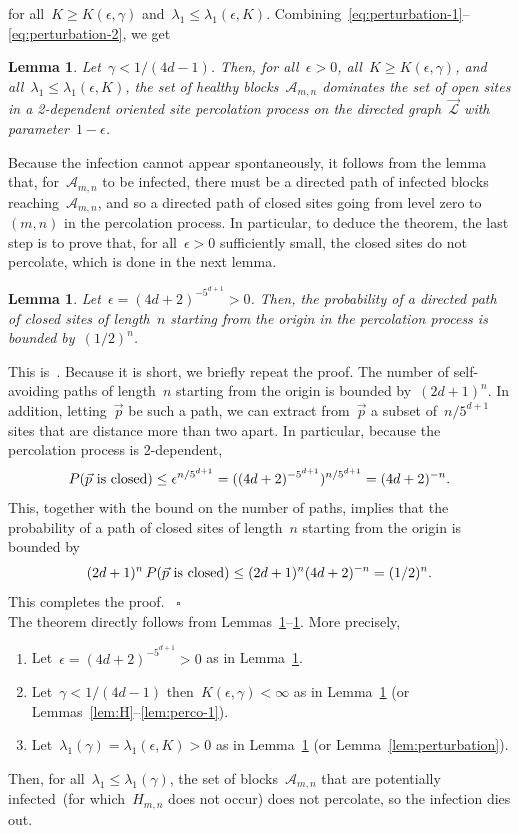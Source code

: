 \documentclass[letterpaper,11pt,twoside,keywordsasfootnote,addressatend,noinfoline]{article}
\newtheorem{lemma}[theorem]{Lemma}
\newenvironment{proof}{\noindent{\bf Proof.}}{\hspace*{2mm}~$\square$}
\newcommand{\A}{\mathscr{A}}
\newcommand{\Lat}{\mathscr{L}}
\newcommand{\ep}{\epsilon}
\begin{document}
 for all~$K \geq K (\ep, \gamma)$ and~$\lambda_1 \leq \lambda_1 (\ep, K)$.
 Combining~\eqref{eq:perturbation-1}--\eqref{eq:perturbation-2}, we get
\begin{lemma}
\label{lem:perco-2}
 Let~$\gamma < 1 / (4d - 1)$.
 Then, for all~$\ep > 0$, all~$K \geq K (\ep, \gamma)$, and all~$\lambda_1 \leq \lambda_1 (\ep, K)$, the set of healthy blocks~$\A_{m, n}$ dominates the set of open sites in a 2-dependent oriented site percolation process on the directed graph~$\vec{\Lat}$ with parameter~$1 - \ep$.
\end{lemma}
 Because the infection cannot appear spontaneously, it follows from the lemma that, for~$\A_{m, n}$ to be infected, there must be a directed path of infected blocks reaching~$\A_{m, n}$, and so a directed path of closed sites going from level zero to~$(m, n)$ in the percolation process.
 In particular, to deduce the theorem, the last step is to prove that, for all~$\ep > 0$ sufficiently small, the closed sites do not percolate, which is done in the next lemma.
\begin{lemma}
\label{lem:perco}
 Let~$\ep = (4d + 2)^{-5^{d + 1}} > 0$.
 Then, the probability of a directed path of closed sites of length~$n$ starting from the origin in the percolation process is bounded by~$(1/2)^n$.
\end{lemma}
\begin{proof}
 This is~\cite[Lemma~14]{lanchier_mercer_yun}.
 Because it is short, we briefly repeat the proof.
 The number of self-avoiding paths of length~$n$ starting from the origin is bounded by~$(2d + 1)^n$.
 In addition, letting~$\vec{p}$ be such a path, we can extract from~$\vec{p}$ a subset of~$n / 5^{d + 1}$ sites that are distance more than two apart.
 In particular, because the percolation process is 2-dependent,
 $$ P (\vec{p} \ \hbox{is closed}) \leq \ep^{n / 5^{d + 1}} = ((4d + 2)^{-5^{d + 1}})^{n / 5^{d + 1}} = (4d + 2)^{-n}. $$
 This, together with the bound on the number of paths, implies that the probability of a path of closed sites of length~$n$ starting from the origin is bounded by
 $$ (2d + 1)^n \,P (\vec{p} \ \hbox{is closed}) \leq (2d + 1)^n (4d + 2)^{-n} = (1/2)^n. $$
 This completes the proof.
\end{proof} \vspace*{8pt} \\
 The theorem directly follows from Lemmas~\ref{lem:perco-2}--\ref{lem:perco}.
 More precisely,
\begin{enumerate}
\item Let~$\ep = (4d + 2)^{-5^{d + 1}} > 0$ as in Lemma~\ref{lem:perco}. \vspace*{4pt}
\item Let~$\gamma < 1 / (4d - 1)$ then~$K (\ep, \gamma) < \infty$ as in Lemma~\ref{lem:perco-2} (or Lemmas~\ref{lem:H}--\ref{lem:perco-1}). \vspace*{4pt}
\item Let~$\lambda_1 (\gamma) = \lambda_1 (\ep, K) > 0$ as in Lemma~\ref{lem:perco-2} (or Lemma~\ref{lem:perturbation}).
\end{enumerate}
 Then, for all~$\lambda_1 \leq \lambda_1 (\gamma)$, the set of blocks~$\A_{m, n}$ that are potentially infected~(for which~$H_{m, n}$ does not occur) does not percolate, so the infection dies out.
\end{document}
